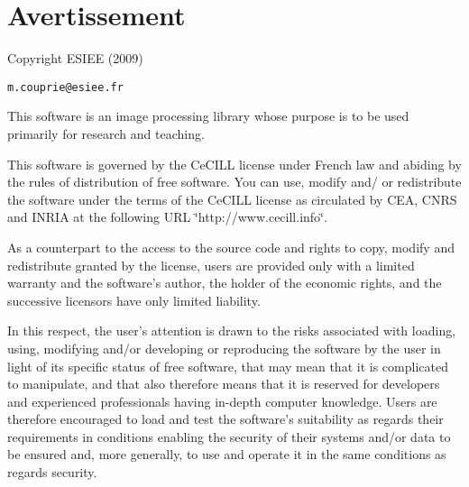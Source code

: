 \section{Avertissement}\label{index_warning}
Copyright ESIEE (2009)

\tt{m.couprie@esiee.fr}

This software is an image processing library whose purpose is to be used primarily for research and teaching.

This software is governed by the Ce\-CILL license under French law and abiding by the rules of distribution of free software. You can use, modify and/ or redistribute the software under the terms of the Ce\-CILL license as circulated by CEA, CNRS and INRIA at the following URL \char`\"{}http://www.cecill.info\char`\"{}.

As a counterpart to the access to the source code and rights to copy, modify and redistribute granted by the license, users are provided only with a limited warranty and the software's author, the holder of the economic rights, and the successive licensors have only limited liability.

In this respect, the user's attention is drawn to the risks associated with loading, using, modifying and/or developing or reproducing the software by the user in light of its specific status of free software, that may mean that it is complicated to manipulate, and that also therefore means that it is reserved for developers and experienced professionals having in-depth computer knowledge. Users are therefore encouraged to load and test the software's suitability as regards their requirements in conditions enabling the security of their systems and/or data to be ensured and, more generally, to use and operate it in the same conditions as regards security.

